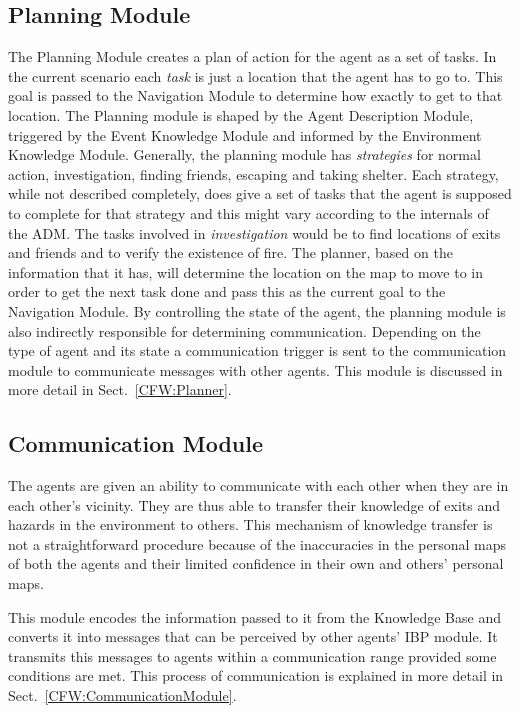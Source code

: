 \subsection{Planning Module}
\label{IBEVAC:PlanningModule}
The Planning Module creates a plan of action for the agent as a set of tasks. In the current scenario each \emph{task} is just a location that the agent has to go to. This goal is passed to the Navigation Module to determine how exactly to get to that location. The Planning module is shaped by the Agent Description Module, triggered by the Event Knowledge Module and informed by the Environment Knowledge Module. Generally, the planning module has \emph{strategies} for normal action, investigation, finding friends, escaping and taking shelter. Each strategy, while not described completely, does give a set of tasks that the agent is supposed to complete for that strategy and this might vary according to the internals of the ADM. The tasks involved in \emph{investigation} would be to find locations of exits and friends and to verify the existence of fire. The planner, based on the information that it has, will determine the location on the map to move to in order to get the next task done and pass this as the current goal to the Navigation Module. By controlling the state of the agent, the planning module is also indirectly responsible for determining communication. Depending on the type of agent and its state a communication trigger is sent to the communication module to communicate messages with other agents. This module is discussed in more detail in Sect.~\ref{CFW:Planner}.

\subsection{Communication Module}
\label{IBEVAC:CommunicationModule}
 The agents are given an ability to communicate with each other when they are in each other's vicinity. They are thus able to transfer their knowledge of exits and hazards in the environment to others. This mechanism of knowledge transfer is not a straightforward procedure because of the inaccuracies in the personal maps of both the agents and their limited confidence in their own and others' personal maps.

 This module encodes the information passed to it from the Knowledge Base and converts it into messages that can be perceived by other agents' IBP module. It transmits this messages to agents within a communication range provided some conditions are met. This process of communication is explained in more detail in Sect.~\ref{CFW:CommunicationModule}.


